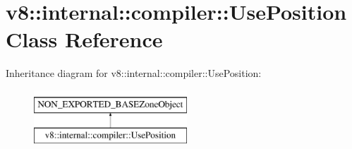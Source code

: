 \hypertarget{classv8_1_1internal_1_1compiler_1_1UsePosition}{}\section{v8\+:\+:internal\+:\+:compiler\+:\+:Use\+Position Class Reference}
\label{classv8_1_1internal_1_1compiler_1_1UsePosition}
Inheritance diagram for v8\+:\+:internal\+:\+:compiler\+:\+:Use\+Position\+:\begin{figure}[H]
\begin{center}
\leavevmode
\includegraphics[height=2.000000cm]{classv8_1_1internal_1_1compiler_1_1UsePosition}
\end{center}
\end{figure}
